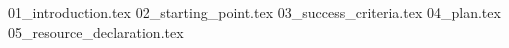 \documentclass[12pt]{report}
\begin{document}

{01_introduction.tex}
{02_starting_point.tex}
{03_success_criteria.tex}
{04_plan.tex}
{05_resource_declaration.tex}

\printbibliography{}
\end{document}
